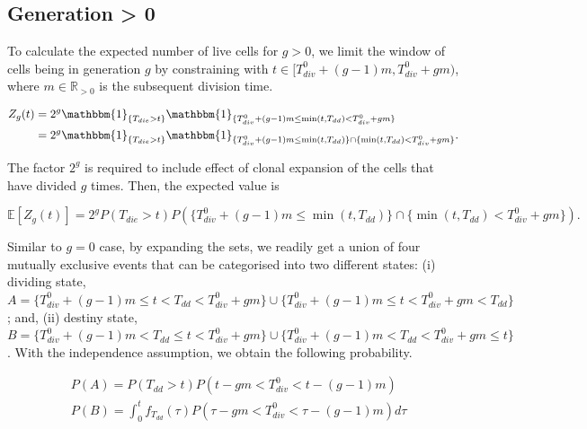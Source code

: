 \documentclass[11pt, a4paper]{article}
\begin{document}
\subsection{Generation > 0}
To calculate the expected number of live cells for $g>0$, we limit the window of cells being in generation $g$ by constraining with $t \in [T_{div}^0 + (g-1)m, T_{div}^0 + gm)$, where $m \in \mathbb{R}_{>0}$ is the subsequent division time.
\begin{linenomath*}
    \begin{align*}
        Z_g(t) & = 2^g \mathbbm{1}_{\{T_{die} > t\}} \mathbbm{1}_{\{T_{div}^0 + (g-1)m \leq \min(t, T_{dd}) < T_{div}^0 + gm\}} \\
        & = 2^g \mathbbm{1}_{\{T_{die} > t\}} \mathbbm{1}_{\{T_{div}^0 + (g-1)m \leq \min(t, T_{dd})\} \cap \{\min(t, T_{dd}) < T_{div}^0 + gm\}}.
    \end{align*}
\end{linenomath*}
The factor $2^g$ is required to include effect of clonal expansion of the cells that have divided $g$ times. Then, the expected value is
\begin{linenomath*}
    \begin{equation}
        \label{eq:primitive_gen_gr0}
        \mathbb{E}[Z_g(t)] = 2^g P(T_{die} > t)P(\{T_{div}^0 + (g-1)m \leq \min(t, T_{dd})\} \cap \{\min(t,T_{dd}) < T_{div}^0 + gm\}).
    \end{equation}
\end{linenomath*}
Similar to $g=0$ case, by expanding the sets, we readily get a union of four mutually exclusive events that can be categorised into two different states: (i) dividing state, $A = \{T_{div}^0 + (g-1)m \leq t < T_{dd} < T_{div}^0 + gm\} \cup \{T_{div}^0 + (g-1)m \leq t < T_{div}^0 + gm < T_{dd}\}$; and, (ii) destiny state, $B = \{T_{div}^0 + (g-1)m < T_{dd} \leq t < T_{div}^0 + gm\} \cup \{T_{div}^0 + (g-1)m < T_{dd} < T_{div}^0 + gm \leq t\}$. With the independence assumption, we obtain the following probability.
\begin{linenomath*}
    \begin{equation}
     \label{eq:prob_gen_gr0}
    \begin{aligned}
        & P(A) = P(T_{dd} > t) P(t - gm < T_{div}^0 < t - (g-1)m) \\
        & P(B) = \int_0^t f_{T_{dd}} (\tau) P(\tau - gm < T_{div}^0 < \tau - (g-1)m) d\tau
    \end{aligned}
    \end{equation}
\end{linenomath*}
\end{document}
